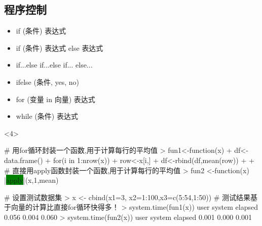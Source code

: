 \subsection{程序控制}
\begin{frame}[t,fragile]{\subsecname}{}
  \begin{itemize}
  \item<1-> if (条件) {表达式}
  \item<1-> if (条件) {表达式} else {表达式}
  \item<1-> if...else if...else if... else...
  \item<1-> ifelse (条件, yes, no)
  \item<2-> for (变量 in 向量) {表达式}
  \item<2-> while (条件) {表达式} 
  \end{itemize}

\begin{overlayarea}{\textwidth}{\textheight}

\begin{onlyenv}<4>
\begin{rcode}
# 用for循环封装一个函数,用于计算每行的平均值
> fun1<-function(x){
+   df<-data.frame()
+   for(i in 1:nrow(x)){
+     row<-x[i,]
+     df<-rbind(df,mean(row))
+   }
+ }
# 直接用apply函数封装一个函数,用于计算每行的平均值
> fun2 <-function(x){ |\colorbox{green}{apply}|(x,1,mean) }

# 设置测试数据集
> x <- cbind(x1=3, x2=1:100,x3=c(5:54,1:50))
# 测试结果基于向量的计算比直接for循环快得多！
> system.time(fun1(x))
   user  system elapsed 
  0.056   0.004   0.060 
> system.time(fun2(x))
   user  system elapsed 
  0.001   0.000   0.001
\end{rcode}
\end{onlyenv}
\end{overlayarea}
\end{frame}

